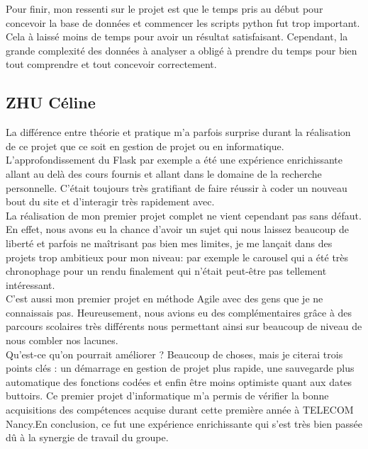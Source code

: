 Pour finir, mon ressenti sur le projet est que le temps pris au début pour concevoir la base de données et commencer les scripts python fut trop important.
Cela à laissé moins de temps pour avoir un résultat satisfaisant.
Cependant, la grande complexité des données à analyser a obligé à prendre du temps pour bien tout comprendre et tout concevoir correctement.

\subsection{ZHU Céline}

La différence entre théorie et pratique m’a parfois surprise durant la réalisation de ce projet que ce soit en gestion de projet ou en informatique.\\ L'approfondissement du Flask par exemple a été une expérience enrichissante allant au delà des cours fournis et allant dans le domaine de la recherche personnelle. C'était toujours très gratifiant de faire réussir à coder un nouveau bout du site et d'interagir très rapidement avec.\\

La réalisation de mon premier projet complet ne vient cependant pas sans défaut. En effet, nous avons eu la chance d'avoir un sujet qui nous laissez beaucoup de liberté et parfois ne maîtrisant pas bien mes limites, je me lançait dans des projets trop ambitieux pour mon niveau: par exemple le carousel qui a été très chronophage pour un rendu finalement qui n'était peut-être pas tellement intéressant.\\

C'est aussi mon premier projet en méthode Agile avec des gens que je ne connaissais pas. Heureusement, nous avions eu des complémentaires grâce à des parcours scolaires très différents nous permettant ainsi sur beaucoup de niveau de nous combler nos lacunes.\\

Qu’est-ce qu’on pourrait améliorer ? Beaucoup de choses, mais je citerai trois
points clés : un démarrage en gestion de projet plus rapide, une sauvegarde plus automatique des fonctions codées et enfin être moins optimiste quant aux dates buttoirs. Ce premier projet d’informatique m’a permis de vérifier la bonne acquisitions des compétences acquise durant cette première année à TELECOM Nancy.En conclusion, ce fut une expérience enrichissante qui s’est très bien passée dû à la synergie de travail du groupe.